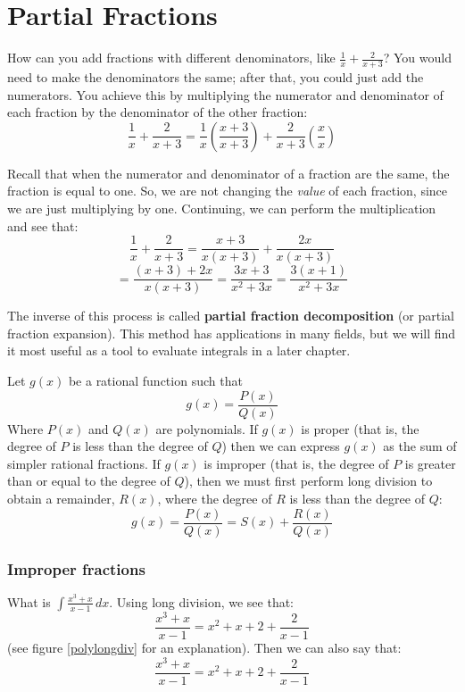 \chapter{Partial Fractions}

How can you add fractions with different denominators, like $\frac{1}{x} + 
\frac{2}{x + 3}$? You would need to make the denominators the same; after that, you 
could just add the numerators. You achieve this by multiplying the numerator 
and denominator of each fraction by the denominator of the other fraction:
$$\frac{1}{x} + \frac{2}{x + 3} = \frac{1}{x} \left( \frac{x + 3}{x + 3} 
\right) + \frac{2}{x + 3} \left( \frac{x}{x} \right)$$

Recall that when the numerator and denominator of a fraction are the same, the 
fraction is equal to one. So, we are not changing the \textit{value} of each 
fraction, since we are just multiplying by one. Continuing, we can perform the 
multiplication and see that:
$$\frac{1}{x} + \frac{2}{x + 3} = \frac{x + 3}{x(x + 3)} + \frac{2x}{x(x + 3)}$$
$$= \frac{(x + 3) + 2x}{x(x + 3)} = \frac{3x + 3}{x^2 + 3x} = \frac{3(x + 1)}{x
^2 + 3x}$$

The inverse of this process is called \textbf{partial fraction decomposition} 
(or partial fraction expansion). This 
method has applications in many fields, but we will find it most useful as a 
tool to evaluate integrals in a later chapter. 


Let $g(x)$ be a rational function such that 
$$g(x) = \frac{P(x)}{Q(x)}$$
Where $P(x)$ and $Q(x)$ are polynomials. If $g(x)$ is proper (that is, the 
degree of $P$ is less than the degree of $Q$) then we can express $g(x)$ as 
the sum of simpler rational fractions. If $g(x)$ is improper (that is, the 
degree of $P$ is greater than or equal to the degree of $Q$), then we must 
first perform long division to obtain a remainder, $R(x)$, where the degree 
of $R$ is less than the degree of $Q$:
$$g(x) = \frac{P(x)}{Q(x)} = S(x) + \frac{R(x)}{Q(x)}$$

\subsection{Improper fractions}
What is $\int \frac{x^3 + x}{x-1}\,dx$. Using long division, we see that:
$$\frac{x^3 + x}{x - 1} = x^2 + x + 2 + \frac{2}{x - 1}$$
(see figure \ref{polylongdiv} for an explanation). Then we can also say that:
$$\frac{x^3 + x}{x-1} = x^2 + x + 2 + \frac{2}{x-1}$$

